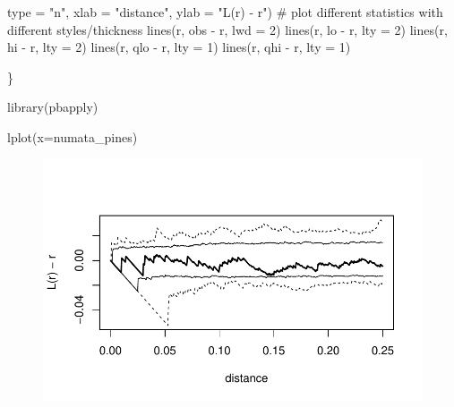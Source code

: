\documentclass[
  letterpaper,
  DIV=11,
  numbers=noendperiod]{scrartcl}
\newenvironment{Shaded}{\begin{snugshade}}{\end{snugshade}}
\newcommand{\AttributeTok}[1]{\textcolor[rgb]{0.40,0.45,0.13}{#1}}
\newcommand{\CommentTok}[1]{\textcolor[rgb]{0.37,0.37,0.37}{#1}}
\newcommand{\DecValTok}[1]{\textcolor[rgb]{0.68,0.00,0.00}{#1}}
\newcommand{\FunctionTok}[1]{\textcolor[rgb]{0.28,0.35,0.67}{#1}}
\newcommand{\NormalTok}[1]{\textcolor[rgb]{0.00,0.23,0.31}{#1}}
\newcommand{\SpecialCharTok}[1]{\textcolor[rgb]{0.37,0.37,0.37}{#1}}
\newcommand{\StringTok}[1]{\textcolor[rgb]{0.13,0.47,0.30}{#1}}
\begin{document}
\begin{Shaded}
\begin{Highlighting}[]
       \AttributeTok{type =} \StringTok{"n"}\NormalTok{,}
       \AttributeTok{xlab =} \StringTok{"distance"}\NormalTok{, }\AttributeTok{ylab =} \StringTok{"L(r) {-} r"}\NormalTok{)}
  \CommentTok{\# plot different statistics with different styles/thickness}
  \FunctionTok{lines}\NormalTok{(r, obs }\SpecialCharTok{{-}}\NormalTok{ r, }\AttributeTok{lwd =} \DecValTok{2}\NormalTok{)}
  \FunctionTok{lines}\NormalTok{(r, lo }\SpecialCharTok{{-}}\NormalTok{ r, }\AttributeTok{lty =} \DecValTok{2}\NormalTok{)}
  \FunctionTok{lines}\NormalTok{(r, hi }\SpecialCharTok{{-}}\NormalTok{ r, }\AttributeTok{lty =} \DecValTok{2}\NormalTok{)}
  \FunctionTok{lines}\NormalTok{(r, qlo }\SpecialCharTok{{-}}\NormalTok{ r, }\AttributeTok{lty =} \DecValTok{1}\NormalTok{)}
  \FunctionTok{lines}\NormalTok{(r, qhi }\SpecialCharTok{{-}}\NormalTok{ r, }\AttributeTok{lty =} \DecValTok{1}\NormalTok{)}
  
\NormalTok{\}}
\end{Highlighting}
\end{Shaded}

\begin{Shaded}
\begin{Highlighting}[]
\FunctionTok{library}\NormalTok{(pbapply)}

\FunctionTok{lplot}\NormalTok{(}\AttributeTok{x=}\NormalTok{numata\_pines)}
\end{Highlighting}
\end{Shaded}

\begin{figure}[H]

{\centering \includegraphics{robby_homework_2_files/figure-pdf/unnamed-chunk-3-1.pdf}

}

\end{figure}
\end{document}
